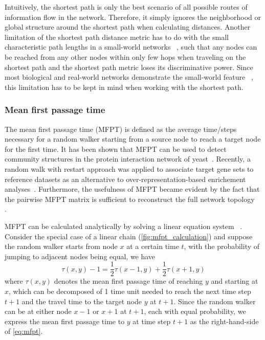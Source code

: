 Intuitively, the shortest path is only the best scenario of all possible routes
of information flow in the network. Therefore, it simply ignores the 
neighborhood or global structure around the shortest path when calculating
distances. Another limitation of the shortest path distance metric has to do
with the small characteristic path lengths in a small-world networks~%
\citep{Watts1998}, such that any nodes can be reached from any other nodes
within only few hops when traveling on the shortest path and the shortest path
metric loses its discriminative power. Since most biological
and real-world networks demonstrate the small-world feature~%
\citep{Barabasi2004}, this limitation
has to be kept in mind when working with the shortest path.

\subsubsection{Mean first passage time}
The mean first passage time (MFPT) is defined as the average time/steps 
necessary for 
a random walker starting from a source node to reach a target node for the
first time. It has been shown that MFPT can be used to detect community
structures in the protein interaction network of yeast~\citep{Zhou2003}. 
Recently, a random walk with restart approach was applied to associate
target gene sets to reference datasets as an alternative to 
over-representation-based enrichement analyses~\citep{Glaab2012}. Furthermore,
the usefulness of MFPT became evident by the fact that the pairwise MFPT 
matrix is sufficient to reconstruct the full network topology~%
\citep{Wittmann2009}.

MFPT can be calculated analytically by solving a linear equation system~%
\citep{Kampen2007}. Consider the special case of a linear chain 
(\ref{fig:mfpt_calculation}) and suppose the random walker starts from node 
$x$ at a certain time $t$, with the probability of jumping to adjacent nodes
being equal, we have
\begin{equation}
\tau(x,y) - 1 = \frac{1}{2}\tau(x-1,y) + \frac{1}{2}\tau(x+1,y)
\label{eq:mfpt}
\end{equation}
where $\tau(x,y)$ denotes the mean first passage time of reaching $y$ and 
starting at $x$, which can be decomposed of 1 time unit needed to reach the
next time step $t+1$ and the travel time to the target node $y$ at $t+1$.
Since the random walker can be at either node $x-1$ or $x+1$ at $t+1$, each
with equal probability, we express the mean first passage time to $y$ at
time step $t+1$ as the right-hand-side of \ref{eq:mfpt}.

